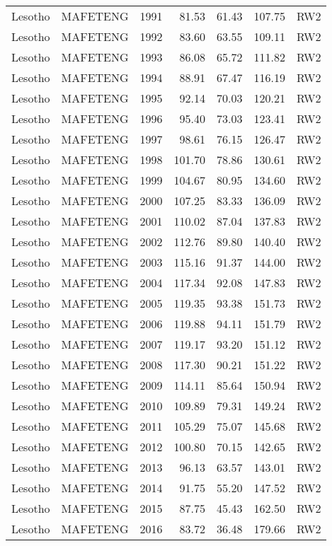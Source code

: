 \begin{longtable}{lllrrrl}
  Lesotho & MAFETENG & 1991 & 81.53 & 61.43 & 107.75 & RW2 \\ 
  Lesotho & MAFETENG & 1992 & 83.60 & 63.55 & 109.11 & RW2 \\ 
  Lesotho & MAFETENG & 1993 & 86.08 & 65.72 & 111.82 & RW2 \\ 
  Lesotho & MAFETENG & 1994 & 88.91 & 67.47 & 116.19 & RW2 \\ 
  Lesotho & MAFETENG & 1995 & 92.14 & 70.03 & 120.21 & RW2 \\ 
  Lesotho & MAFETENG & 1996 & 95.40 & 73.03 & 123.41 & RW2 \\ 
  Lesotho & MAFETENG & 1997 & 98.61 & 76.15 & 126.47 & RW2 \\ 
  Lesotho & MAFETENG & 1998 & 101.70 & 78.86 & 130.61 & RW2 \\ 
  Lesotho & MAFETENG & 1999 & 104.67 & 80.95 & 134.60 & RW2 \\ 
  Lesotho & MAFETENG & 2000 & 107.25 & 83.33 & 136.09 & RW2 \\ 
  Lesotho & MAFETENG & 2001 & 110.02 & 87.04 & 137.83 & RW2 \\ 
  Lesotho & MAFETENG & 2002 & 112.76 & 89.80 & 140.40 & RW2 \\ 
  Lesotho & MAFETENG & 2003 & 115.16 & 91.37 & 144.00 & RW2 \\ 
  Lesotho & MAFETENG & 2004 & 117.34 & 92.08 & 147.83 & RW2 \\ 
  Lesotho & MAFETENG & 2005 & 119.35 & 93.38 & 151.73 & RW2 \\ 
  Lesotho & MAFETENG & 2006 & 119.88 & 94.11 & 151.79 & RW2 \\ 
  Lesotho & MAFETENG & 2007 & 119.17 & 93.20 & 151.12 & RW2 \\ 
  Lesotho & MAFETENG & 2008 & 117.30 & 90.21 & 151.22 & RW2 \\ 
  Lesotho & MAFETENG & 2009 & 114.11 & 85.64 & 150.94 & RW2 \\ 
  Lesotho & MAFETENG & 2010 & 109.89 & 79.31 & 149.24 & RW2 \\ 
  Lesotho & MAFETENG & 2011 & 105.29 & 75.07 & 145.68 & RW2 \\ 
  Lesotho & MAFETENG & 2012 & 100.80 & 70.15 & 142.65 & RW2 \\ 
  Lesotho & MAFETENG & 2013 & 96.13 & 63.57 & 143.01 & RW2 \\ 
  Lesotho & MAFETENG & 2014 & 91.75 & 55.20 & 147.52 & RW2 \\ 
  Lesotho & MAFETENG & 2015 & 87.75 & 45.43 & 162.50 & RW2 \\ 
  Lesotho & MAFETENG & 2016 & 83.72 & 36.48 & 179.66 & RW2 \\ 

\end{longtable}
